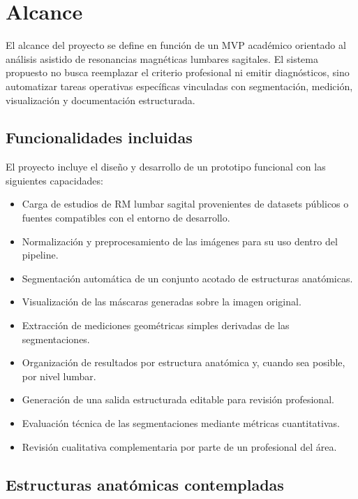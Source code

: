 \chapter{Alcance}

El alcance del proyecto se define en funci\'on de un MVP acad\'emico orientado al an\'alisis asistido de resonancias magn\'eticas lumbares sagitales. El sistema propuesto no busca reemplazar el criterio profesional ni emitir diagn\'osticos, sino automatizar tareas operativas espec\'ificas vinculadas con segmentaci\'on, medici\'on, visualizaci\'on y documentaci\'on estructurada.

\section{Funcionalidades incluidas}

El proyecto incluye el dise\~no y desarrollo de un prototipo funcional con las siguientes capacidades:

\begin{itemize}
    \item Carga de estudios de RM lumbar sagital provenientes de datasets p\'ublicos o fuentes compatibles con el entorno de desarrollo.
    \item Normalizaci\'on y preprocesamiento de las im\'agenes para su uso dentro del pipeline.
    \item Segmentaci\'on autom\'atica de un conjunto acotado de estructuras anat\'omicas.
    \item Visualizaci\'on de las m\'ascaras generadas sobre la imagen original.
    \item Extracci\'on de mediciones geom\'etricas simples derivadas de las segmentaciones.
    \item Organizaci\'on de resultados por estructura anat\'omica y, cuando sea posible, por nivel lumbar.
    \item Generaci\'on de una salida estructurada editable para revisi\'on profesional.
    \item Evaluaci\'on t\'ecnica de las segmentaciones mediante m\'etricas cuantitativas.
    \item Revisi\'on cualitativa complementaria por parte de un profesional del \'area.
\end{itemize}

\section{Estructuras anat\'omicas contempladas}

